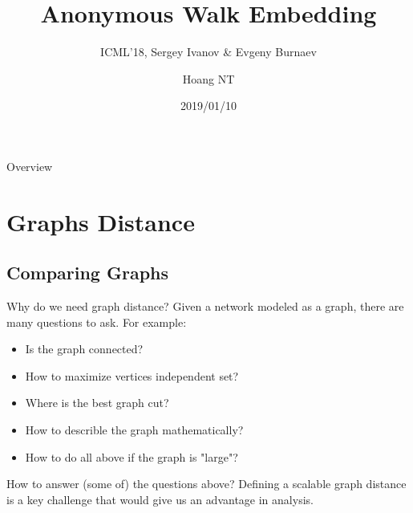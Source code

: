 \documentclass{beamer}
\title{Anonymous Walk Embedding}
\subtitle{ICML'18, Sergey Ivanov \& Evgeny Burnaev}
\author{Hoang NT}
\institute{Murata Laboratory \\ Tokyo Tech \vspace{4em}}
\date{2019/01/10}
\begin{document}
    \begin{frame}
        \maketitle
    \end{frame}

    \begin{frame}{Overview}
        \tableofcontents
    \end{frame}

    \section{Graphs Distance}

    \subsection{Comparing Graphs}

    \begin{frame}{Why do we need graph distance?}
        Given a network modeled as a graph, there are many questions to ask. For example:
        \pause
        \begin{itemize}
            \item Is the graph connected? 
            \item How to maximize vertices independent set?
            \item Where is the best graph cut?
            \item How to describle the graph mathematically?
            \item How to do all above if the graph is "large"?
        \end{itemize}
        \pause
        \vspace{1em}
        \begin{block}{How to answer (some of) the questions above?}
            Defining a scalable graph distance is a key challenge that would 
            give us an advantage in analysis.
        \end{block}
    \end{frame}
\end{document}

